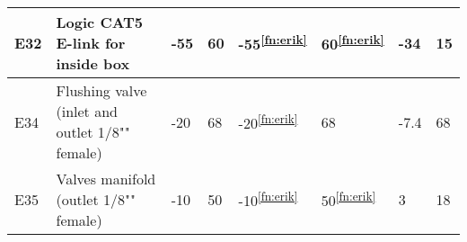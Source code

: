 \begin{longtable}{|m{1cm}|m{3.5cm}|m{1.3cm}|m{1.3cm}|m{1.4cm}|m{1.3cm}|m{1.3cm}|m{1.3cm}|}
E32 & Logic CAT5 E-link for inside box &-55 & 60 & -55\textsuperscript{\ref{fn:erik}} & 60\textsuperscript{\ref{fn:erik}} & -34 & 15 \\ \hline
E34 & Flushing valve (inlet and outlet 1/8"" female) & -20 & 68 & -20\textsuperscript{\ref{fn:erik}} & 68 & -7.4 & 68 \\ \hline
E35 & Valves manifold (outlet 1/8"" female) & -10 & 50 & -10\textsuperscript{\ref{fn:erik}} & 50\textsuperscript{\ref{fn:erik}} & 3 & 18 \\ \hline

\end{longtable}
